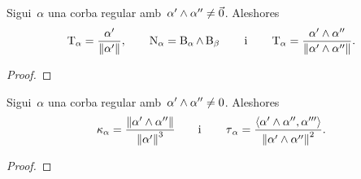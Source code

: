 \documentclass[../../Main.tex]{subfiles}
\begin{document}
	\begin{proposition}
		\label{prop:triedre de frenet d'una corba regular}
		\label{prop:tangent d'una corba regular}
		\label{prop:normal d'una corba regular}
		\label{prop:binormal d'una corba regular}
		Sigui~\(\alpha\) una corba regular amb~\(\alpha'\mathbin{\wedge}\alpha''\neq\vec{0}\).
		Aleshores
		\[
		    \tangent_{\alpha}=\frac{\alpha'}{\norm{\alpha'}},\qquad\normal_{\alpha}=\binormal_{\alpha}\prodvec\binormal_{\beta}\qquad\text{i}\qquad\tangent_{\alpha}=\frac{\alpha'\prodvec\alpha''}{\norm{\alpha'\prodvec\alpha''}}.
		\]
		\begin{proof}
		\end{proof}
	\end{proposition}
	\begin{proposition}
		\label{prop:curvatura i torsió d'una corba regular}
		\label{prop:curvatura d'una corba regular}
		\label{prop:torsió d'una corba regular}
		Sigui~\(\alpha\) una corba regular amb~\(\alpha'\mathbin{\wedge}\alpha''\neq0\).
		Aleshores
		\[
		    \curvatura_{\alpha}=\frac{\norm{\alpha'\prodvec\alpha''}}{\norm{\alpha'}^{3}}\qquad\text{i}\qquad\torsio_{\alpha}=\frac{\prodesc{\alpha'\prodvec\alpha''}{\alpha'''}}{\norm{\alpha'\prodvec\alpha''}^{2}}.
		\]
		\begin{proof}
		\end{proof}
	\end{proposition}
\end{document}
